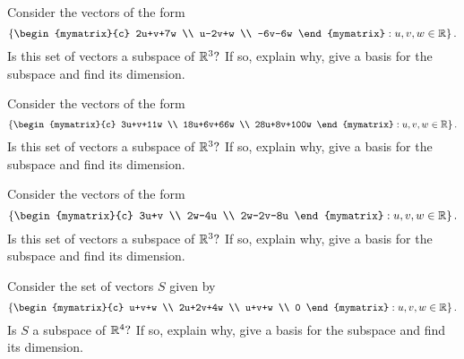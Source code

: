 \begin{enumialphparenastyle}
\begin{ex} Consider the vectors of the form 
\begin{equation*}
\left\{ \begin{mymatrix}{c}
2u+v+7w \\ 
u-2v+w \\ 
-6v-6w
\end{mymatrix} :u,v,w\in \R\right\} .
\end{equation*}
Is this set of vectors a subspace of $\mathbb{R}^{3}?$ If so, explain why,
give a basis for the subspace and find its dimension.
\end{ex}

\begin{ex} Consider the vectors of the form 
\begin{equation*}
\left\{ \begin{mymatrix}{c}
3u+v+11w \\ 
18u+6v+66w \\ 
28u+8v+100w
\end{mymatrix} :u,v,w\in \R\right\} .
\end{equation*}
Is this set of vectors a subspace of $\mathbb{R}^{3}?$ If so, explain why,
give a basis for the subspace and find its dimension.
\end{ex}

\begin{ex} Consider the vectors of the form 
\begin{equation*}
\left\{ \begin{mymatrix}{c}
3u+v \\ 
2w-4u \\ 
2w-2v-8u
\end{mymatrix} :u,v,w\in \R\right\} .
\end{equation*}
Is this set of vectors a subspace of $\mathbb{R}^{3}?$ If so, explain why,
give a basis for the subspace and find its dimension.
\end{ex}

\begin{ex} Consider the set of vectors $S$ given by  
\begin{equation*}
\left\{ \begin{mymatrix}{c}
u+v+w \\ 
2u+2v+4w \\ 
u+v+w \\ 
0
\end{mymatrix} :u,v,w\in \R\right\} .
\end{equation*}
Is $S$ a subspace of $\mathbb{R}^{4}?$ If so, explain why,
give a basis for the subspace and find its dimension.
\end{ex}


\end{enumialphparenastyle}
